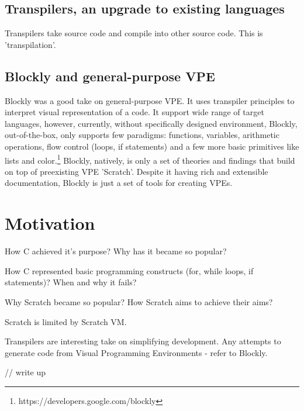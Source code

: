 \documentclass{article}
\begin{document}
\subsection{Transpilers, an upgrade to existing languages}
Transpilers take source code and compile into other source code. This is 'transpilation'.\citep{cifuentes_1998_assembly}

\subsection{Blockly and general-purpose VPE}
Blockly was a good take on general-purpose VPE. It uses transpiler principles to interpret visual representation of a code.\citep*{7369000} It support wide range of target languages, however, currently, without specifically designed environment, Blockly, out-of-the-box, only supports few paradigms: functions, variables, arithmetic operations, flow control (loops, if statements) and a few more basic primitives like lists and color.\footnote{https://developers.google.com/blockly}
Blockly, natively, is only a set of theories and findings that build on top of preexisting VPE 'Scratch'.\citep{8120404} Despite it having rich and extensible documentation, Blockly is just a set of tools for creating VPEs.\citep{whitley_2006_evidence,bresson_2007_musical}





\section{Motivation}
\label{sec:motive}
How C achieved it's purpose?
Why has it became so popular?

How C represented basic programming constructs (for, while loops, if statements)?
When and why it fails?

Why Scratch became so popular?
How Scratch aims to achieve their aims?

Scratch is limited by Scratch VM.

Transpilers are interesting take on simplifying development.
Any attempts to generate code from Visual Programming Environments - refer to Blockly.


// write up
\end{document}
